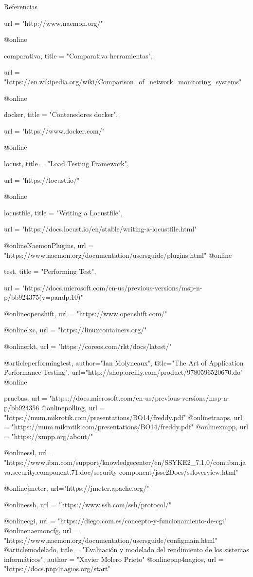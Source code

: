 \documentclass{beamer}
\theoremstyle{plain}
\theoremstyle{definition}
\theoremstyle{plain}
\theoremstyle{definition}
\theoremstyle{remark}
\theoremstyle{definition}
\begin{document}
\begin{frame}{Referencias}
\begin{thebibliography}{9}
{			url    = "http://www.naemon.org/"
		}
		
		@online{comparativa,
			title = "Comparativa herramientas",
			
			url = "https://en.wikipedia.org/wiki/Comparison_of_network_monitoring_systems"
		}
		@online{docker,
			title = "Contenedores docker",
			
			url = "https://www.docker.com/"
		}
		
		@online{locust,
			title = "Load Testing Framework",
			
			url = "https://locust.io/"
		}
		@online{locustfile,
			title = "Writing a Locustfile",
			
			url = "https://docs.locust.io/en/stable/writing-a-locustfile.html"
		}
		@online{NaemonPlugins,
			url = "https://www.naemon.org/documentation/usersguide/plugins.html"}
		@online{test,
			title = "Performing Test",
			
			url = "https://docs.microsoft.com/en-us/previous-versions/msp-n-p/bb924375(v=pandp.10)"
		}
		@online{openshift,
			url = "https://www.openshift.com/"}
		
		@online{lxc,
			url = "https://linuxcontainers.org/"}
		
		@online{rkt,
			url = "https://coreos.com/rkt/docs/latest/"}
		
		@article{performingtest,
			author="Ian Molyneaux",
			title="The Art of Application Performance Testing",
			url="http://shop.oreilly.com/product/9780596520670.do"
		}
		@online{pruebas,
			url = "https://docs.microsoft.com/en-us/previous-versions/msp-n-p/bb924356%
			@online{polling,
				url = "https://mum.mikrotik.com/presentations/BO14/freddy.pdf"
			}
			@online{traaps,
				url = "https://mum.mikrotik.com/presentations/BO14/freddy.pdf"
			}
			@online{xmpp,
				url = "https://xmpp.org/about/"}
			
			@online{ssl,
				url = "https://www.ibm.com/support/knowledgecenter/en/SSYKE2_7.1.0/com.ibm.java.security.component.71.doc/security-component/jsse2Docs/ssloverview.html"}
			
			@online{jmeter, 
				url="https://jmeter.apache.org/"
			}
			
			@online{ssh,
				url = "https://www.ssh.com/ssh/protocol/"}
			
			@online{cgi,
				url = "https://diego.com.es/concepto-y-funcionamiento-de-cgi"}
			@online{naemoncfg,
				url = "https://www.naemon.org/documentation/usersguide/configmain.html"}
			@article{modelado,
				title = "Evaluación y modelado del rendimiento de los sistemas informáticos",
				author = "Xavier Molero Prieto"}
			@online{pnp4nagios,
				url = "https://docs.pnp4nagios.org/start"}
			
}
\end{thebibliography}
\end{frame}
\end{document}

